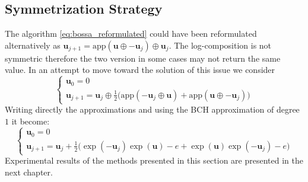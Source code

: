 \subsection{Symmetrization Strategy}
The algorithm \ref{eq:bossa_reformulated} could have been reformulated alternatively as $\mathbf{u}_{j+1} =    \text{app}(\mathbf{u} \oplus  - \mathbf{u}_{j}  ) \oplus \mathbf{u}_{j}$. The log-composition is not symmetric therefore the two version in some cases may not return the same value. In an attempt to move toward the solution of this issue we consider
\begin{equation}\label{eq:bossa_symmetric}
\begin{cases}
\mathbf{u}_0 = 0 \\
\mathbf{u}_{j+1} = \mathbf{u}_{j} \oplus 
\frac{1}{2}
\big(  
\text{app}(-\mathbf{u}_{j}  \oplus  \mathbf{u} )
+
\text{app}(\mathbf{u} \oplus  - \mathbf{u}_{j}  )
\big)
\end{cases}
\end{equation}
Writing directly the approximations and using the BCH approximation of degree $1$ it become:
\begin{equation}
\begin{cases}
\mathbf{u}_0 = 0 \\
\mathbf{u}_{j+1} 
=
\mathbf{u}_{j} +  
\frac{1}{2}
\big(  
\exp(-\mathbf{u}_{j})  \exp(\mathbf{u} ) - e
+
\exp(\mathbf{u}) \exp(-\mathbf{u}_{j}) - e
\big)
\end{cases}
\end{equation}
Experimental results of the methods presented in this section are presented in the next chapter. %











